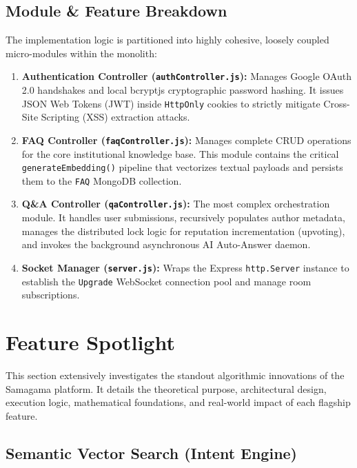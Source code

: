 \documentclass[12pt,a4paper]{article}
\begin{document}
\subsection{Module \& Feature Breakdown}
The implementation logic is partitioned into highly cohesive, loosely coupled micro-modules within the monolith:
\begin{enumerate}
    \item \textbf{Authentication Controller (\texttt{authController.js}):} Manages Google OAuth 2.0 handshakes and local bcryptjs cryptographic password hashing. It issues JSON Web Tokens (JWT) inside \texttt{HttpOnly} cookies to strictly mitigate Cross-Site Scripting (XSS) extraction attacks.
    \item \textbf{FAQ Controller (\texttt{faqController.js}):} Manages complete CRUD operations for the core institutional knowledge base. This module contains the critical \texttt{generateEmbedding()} pipeline that vectorizes textual payloads and persists them to the \texttt{FAQ} MongoDB collection.
    \item \textbf{Q\&A Controller (\texttt{qaController.js}):} The most complex orchestration module. It handles user submissions, recursively populates author metadata, manages the distributed lock logic for reputation incrementation (upvoting), and invokes the background asynchronous AI Auto-Answer daemon.
    \item \textbf{Socket Manager (\texttt{server.js}):} Wraps the Express \texttt{http.Server} instance to establish the \texttt{Upgrade} WebSocket connection pool and manage room subscriptions.
\end{enumerate}

\newpage

\section{Feature Spotlight}
\vspace{0.5cm}
This section extensively investigates the standout algorithmic innovations of the Samagama platform. It details the theoretical purpose, architectural design, execution logic, mathematical foundations, and real-world impact of each flagship feature.

\subsection{Semantic Vector Search (Intent Engine)}
\end{document}

